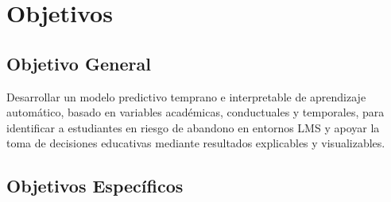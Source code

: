 
\section{Objetivos}

\subsection{Objetivo General}
Desarrollar un modelo predictivo temprano e interpretable de aprendizaje automático, basado en variables académicas, conductuales y temporales, para identificar a estudiantes en riesgo de abandono en entornos LMS y apoyar la toma de decisiones educativas mediante resultados explicables y visualizables.

\subsection{Objetivos Espec\'ificos}


